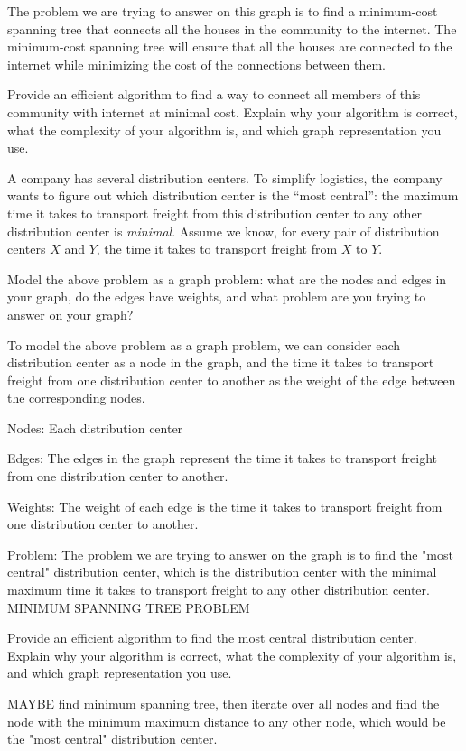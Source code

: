 \begin{problem}
\begin{questions}
The problem we are trying to answer on this graph is to find a minimum-cost spanning tree that connects all the houses in the community to the internet. The minimum-cost spanning tree will ensure that all the houses are connected to the internet while minimizing the cost of the connections between them.

\item Provide an efficient algorithm to find a way to connect all members of this community with internet at minimal cost. Explain why your algorithm is correct, what the complexity of your algorithm is, and which graph representation you use.



\end{questions}
\end{problem}

\begin{problem}
A company has several distribution centers. To simplify logistics, the company wants to figure out which distribution center is the ``most central'': the maximum time it takes to transport freight from this distribution center to any other distribution center is \emph{minimal}. Assume we know, for every pair of distribution centers $X$ and $Y$, the time it takes to transport freight from $X$ to $Y$.
\begin{questions}
\item Model the above problem as a graph problem: what are the nodes and edges in your graph, do the edges have weights, and what problem are you trying to answer on your graph?

To model the above problem as a graph problem, we can consider each distribution center as a node in the graph, and the time it takes to transport freight from one distribution center to another as the weight of the edge between the corresponding nodes.

Nodes: Each distribution center

Edges: The edges in the graph represent the time it takes to transport freight from one distribution center to another.

Weights: The weight of each edge is the time it takes to transport freight from one distribution center to another.

Problem: The problem we are trying to answer on the graph is to find the "most central" distribution center, which is the distribution center with the minimal maximum time it takes to transport freight to any other distribution center.
MINIMUM SPANNING TREE PROBLEM

\item Provide an efficient algorithm to find the most central distribution center. Explain why your algorithm is correct, what the complexity of your algorithm is, and which graph representation you use.

MAYBE find minimum spanning tree, then iterate over all nodes and find the node with the minimum maximum distance to any other node, which would be the "most central" distribution center.


\end{questions}
\end{problem}

